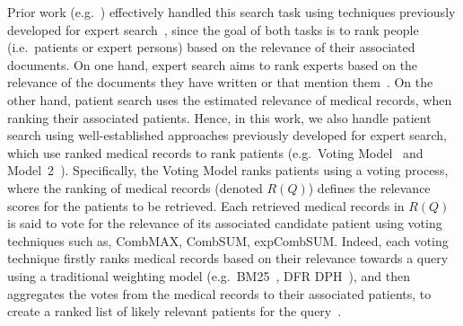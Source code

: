 \documentclass[1p]{elsarticle}
\begin{document}
Prior work (e.g.~\cite{gurulingappa2011trec,limsopatham2011trec,zhu2012shb}) effectively handled this search task using techniques previously developed for expert search~\cite{balog2008trec},
since the goal of both tasks is to rank people (i.e.\ patients or expert persons) based on the relevance of their associated documents. On one hand, expert search aims to rank experts based on the relevance of the documents they have written or that mention them~\cite{balog2008trec}. On the other hand, patient search uses the estimated relevance of medical records, when ranking their associated patients. Hence, in this work, we also handle patient search using well-establ\-i\-s\-hed approaches previously developed for expert search, 
which use ranked medical records to rank patients (e.g.\ Voting Model~\cite{macdonald2006cikm} and Model~2~\cite{balog2006sigir}). Specifically, the Voting Model ranks patients using a voting process, where the ranking of medical records (denoted $R(Q)$) defines the relevance scores for the patients to be retrieved. Each retrieved medical records in $R(Q)$ is said to vote for the relevance of its associated candidate patient using voting techniques such as, CombMAX, CombSUM, expCombSUM. Indeed, each voting technique firstly ranks medical records based on their relevance towards a query using a traditional weighting model (e.g.\ BM25~\cite{robertson1994sigir}, DFR DPH~\cite{amati2007trec}), and then aggregates the votes from the medical records to their associated patients, to create a ranked list of likely relevant patients for the query~\cite{macdonald2006cikm}. 
\end{document}
